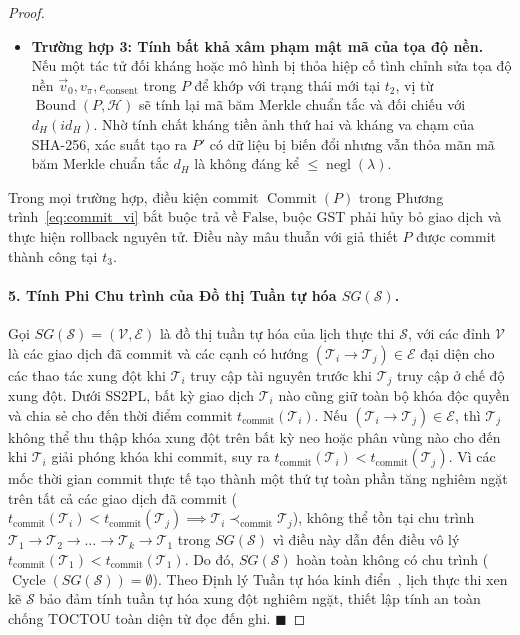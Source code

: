 \documentclass[11pt]{article}
\begin{document}
\begin{proof}
\begin{itemize}
    \item \textbf{Trường hợp 3: Tính bất khả xâm phạm mật mã của tọa độ nền.}
    Nếu một tác tử đối kháng hoặc mô hình bị thỏa hiệp cố tình chỉnh sửa tọa độ nền $\vec{v}_0, v_{\pi}, e_{\text{consent}}$ trong $P$ để khớp với trạng thái mới tại $t_2$, vị từ $\operatorname{Bound}(P, \mathcal{H})$ sẽ tính lại mã băm Merkle chuẩn tắc và đối chiếu với $d_H(id_H)$. Nhờ tính chất kháng tiền ảnh thứ hai và kháng va chạm của SHA-256, xác suất tạo ra $P'$ có dữ liệu bị biến đổi nhưng vẫn thỏa mãn mã băm Merkle chuẩn tắc $d_H$ là không đáng kể $\le \operatorname{negl}(\lambda)$.
\end{itemize}

Trong mọi trường hợp, điều kiện commit $\operatorname{Commit}(P)$ trong Phương trình~\ref{eq:commit_vi} bắt buộc trả về $\text{False}$, buộc GST phải hủy bỏ giao dịch và thực hiện rollback nguyên tử. Điều này mâu thuẫn với giả thiết $P$ được commit thành công tại $t_3$.

\paragraph{5. Tính Phi Chu trình của Đồ thị Tuần tự hóa $SG(\mathcal{S})$.}
Gọi $SG(\mathcal{S}) = (\mathcal{V}, \mathcal{E})$ là đồ thị tuần tự hóa của lịch thực thi $\mathcal{S}$, với các đỉnh $\mathcal{V}$ là các giao dịch đã commit và các cạnh có hướng $(\mathcal{T}_i \to \mathcal{T}_j) \in \mathcal{E}$ đại diện cho các thao tác xung đột khi $\mathcal{T}_i$ truy cập tài nguyên trước khi $\mathcal{T}_j$ truy cập ở chế độ xung đột.
Dưới SS2PL, bất kỳ giao dịch $\mathcal{T}_i$ nào cũng giữ toàn bộ khóa độc quyền và chia sẻ cho đến thời điểm commit $t_{\text{commit}}(\mathcal{T}_i)$. Nếu $(\mathcal{T}_i \to \mathcal{T}_j) \in \mathcal{E}$, thì $\mathcal{T}_j$ không thể thu thập khóa xung đột trên bất kỳ neo hoặc phân vùng nào cho đến khi $\mathcal{T}_i$ giải phóng khóa khi commit, suy ra $t_{\text{commit}}(\mathcal{T}_i) < t_{\text{commit}}(\mathcal{T}_j)$.
Vì các mốc thời gian commit thực tế tạo thành một thứ tự toàn phần tăng nghiêm ngặt trên tất cả các giao dịch đã commit ($t_{\text{commit}}(\mathcal{T}_i) < t_{\text{commit}}(\mathcal{T}_j) \implies \mathcal{T}_i \prec_{\text{commit}} \mathcal{T}_j$), không thể tồn tại chu trình $\mathcal{T}_1 \to \mathcal{T}_2 \to \dots \to \mathcal{T}_k \to \mathcal{T}_1$ trong $SG(\mathcal{S})$ vì điều này dẫn đến điều vô lý $t_{\text{commit}}(\mathcal{T}_1) < t_{\text{commit}}(\mathcal{T}_1)$.
Do đó, $SG(\mathcal{S})$ hoàn toàn không có chu trình ($\operatorname{Cycle}(SG(\mathcal{S})) = \emptyset$). Theo Định lý Tuần tự hóa kinh điển~\cite{eswaran1976}, lịch thực thi xen kẽ $\mathcal{S}$ bảo đảm tính tuần tự hóa xung đột nghiêm ngặt, thiết lập tính an toàn chống TOCTOU toàn diện từ đọc đến ghi. $\blacksquare$
\end{proof}
\end{document}
